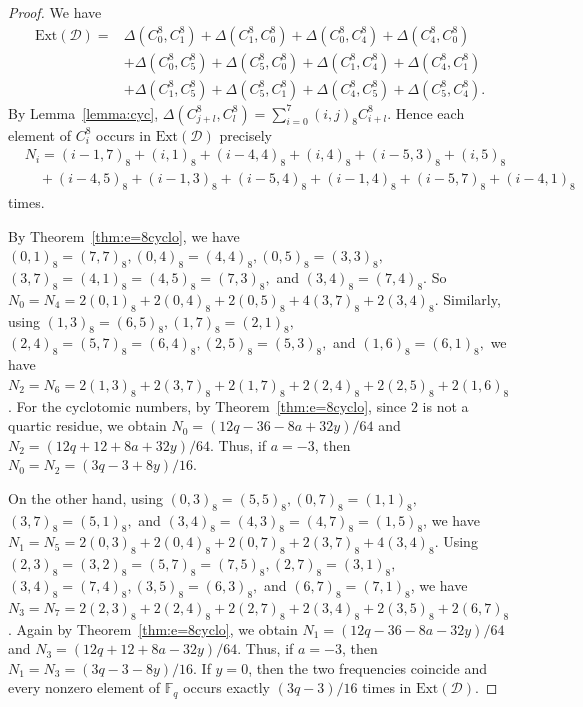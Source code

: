 \documentclass[10pt,a4paper]{amsart}
\begin{document}
\begin{proof}
	We have
	\[
	\begin{aligned}
		\mathrm{Ext}(\mathcal D)
		={}&
		\Delta(C_0^8,C_1^8)+\Delta(C_1^8,C_0^8)
		+\Delta(C_0^8,C_4^8)+\Delta(C_4^8,C_0^8)\\
		&+\Delta(C_0^8,C_5^8)+\Delta(C_5^8,C_0^8)
		+\Delta(C_1^8,C_4^8)+\Delta(C_4^8,C_1^8)\\
		&+\Delta(C_1^8,C_5^8)+\Delta(C_5^8,C_1^8)
		+\Delta(C_4^8,C_5^8)+\Delta(C_5^8,C_4^8).
	\end{aligned}
	\]
	By Lemma~\ref{lemma:cyc},
	$
	\Delta(C_{j+l}^8,C_l^8)
	=
	\sum_{i=0}^7(i,j)_8C_{i+l}^8.
	$
	Hence each element of $C_i^8$ occurs in $\mathrm{Ext}(\mathcal D)$ precisely
	\[
	\begin{aligned}
		&N_i=(i-1,7)_8+(i,1)_8+(i-4,4)_8
		+(i,4)_8+(i-5,3)_8+(i,5)_8\\
		&\quad +(i-4,5)_8+(i-1,3)_8+(i-5,4)_8
		+(i-1,4)_8+(i-5,7)_8+(i-4,1)_8
	\end{aligned}
	\]
	times.
	
	By Theorem~\ref{thm:e=8cyclo}, we have
	$
	(0,1)_8=(7,7)_8,
	(0,4)_8=(4,4)_8,
	(0,5)_8=(3,3)_8,
	$
	$
	(3,7)_8=(4,1)_8=(4,5)_8=(7,3)_8,
	$
	and
	$
	(3,4)_8=(7,4)_8$.
	So $N_0=N_4=
	2(0,1)_8+2(0,4)_8+2(0,5)_8
	+4(3,7)_8+2(3,4)_8.
	$
	Similarly, using
	$
	(1,3)_8=(6,5)_8,
	(1,7)_8=(2,1)_8,
	$
	$
	(2,4)_8=(5,7)_8=(6,4)_8,
	(2,5)_8=(5,3)_8,
	$
	and
	$
	(1,6)_8=(6,1)_8,
	$
	we have
	$
	N_2=N_6=
	2(1,3)_8+2(3,7)_8+2(1,7)_8
	+2(2,4)_8+2(2,5)_8+2(1,6)_8
	$.
	For the cyclotomic numbers, by Theorem~\ref{thm:e=8cyclo}, since $2$
	is not a quartic residue, we obtain
	$
	N_0=(12q-36-8a+32y)/64
	$
	and
	$
	N_2=(12q+12+8a+32y)/64.
	$
	Thus, if $a=-3$, then
	$
	N_0=N_2=(3q-3+8y)/16.
	$
	
	On the other hand, using
	$
	(0,3)_8=(5,5)_8,
	(0,7)_8=(1,1)_8,
	$
	$
	(3,7)_8=(5,1)_8,
	$
	and
	$
	(3,4)_8=(4,3)_8=(4,7)_8=(1,5)_8$,
	we have
    $N_1=N_5=
	2(0,3)_8+2(0,4)_8+2(0,7)_8
	+2(3,7)_8+4(3,4)_8
	$.
	Using
	$
	(2,3)_8=(3,2)_8=(5,7)_8=(7,5)_8,
	(2,7)_8=(3,1)_8,
	$
	$
	(3,4)_8=(7,4)_8,
	(3,5)_8=(6,3)_8,
	$
	and
	$
	(6,7)_8=(7,1)_8$,
    we have 
	$N_3=N_7=
	2(2,3)_8+2(2,4)_8+2(2,7)_8
	+2(3,4)_8+2(3,5)_8+2(6,7)_8
	$.
	Again by Theorem~\ref{thm:e=8cyclo}, we obtain
	$
	N_1=(12q-36-8a-32y)/64
	$
	and
	$
	N_3=(12q+12+8a-32y)/64.
	$
	Thus, if $a=-3$, then
	$
	N_1=N_3=(3q-3-8y)/16$.
If $y=0$, then the two frequencies coincide and every nonzero element of $\mathbb F_q$ occurs exactly
$(3q-3)/16$ times in $\mathrm{Ext}(\mathcal D)$. 
\end{proof}
\end{document}
